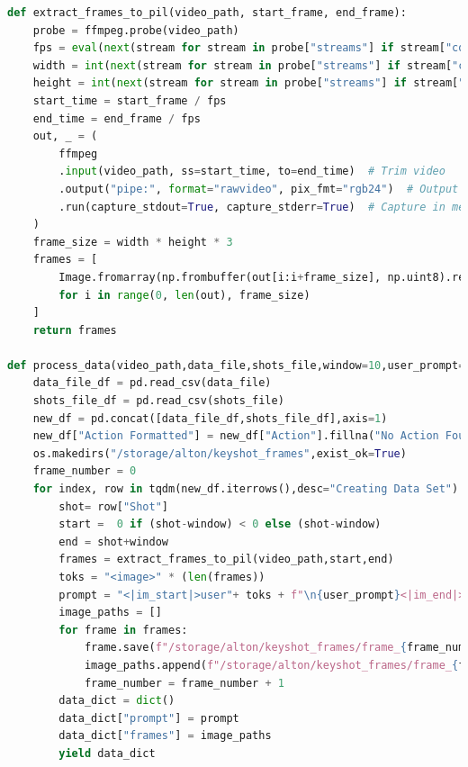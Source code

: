 \documentclass[12pt]{report}
\begin{document}
\begin{lstlisting}[language=Python, caption={Video DataSet Preparator Python Code}]
def extract_frames_to_pil(video_path, start_frame, end_frame):
    probe = ffmpeg.probe(video_path)
    fps = eval(next(stream for stream in probe["streams"] if stream["codec_type"] == "video")["r_frame_rate"])
    width = int(next(stream for stream in probe["streams"] if stream["codec_type"] == "video")["width"])
    height = int(next(stream for stream in probe["streams"] if stream["codec_type"] == "video")["height"])
    start_time = start_frame / fps
    end_time = end_frame / fps
    out, _ = (
        ffmpeg
        .input(video_path, ss=start_time, to=end_time)  # Trim video
        .output("pipe:", format="rawvideo", pix_fmt="rgb24")  # Output raw RGB frames
        .run(capture_stdout=True, capture_stderr=True)  # Capture in memory
    )
    frame_size = width * height * 3
    frames = [
        Image.fromarray(np.frombuffer(out[i:i+frame_size], np.uint8).reshape((height, width, 3)), 'RGB')
        for i in range(0, len(out), frame_size)
    ]
    return frames
    
def process_data(video_path,data_file,shots_file,window=10,user_prompt="What is this?"):
    data_file_df = pd.read_csv(data_file)
    shots_file_df = pd.read_csv(shots_file)
    new_df = pd.concat([data_file_df,shots_file_df],axis=1)
    new_df["Action Formatted"] = new_df["Action"].fillna("No Action Found")
    os.makedirs("/storage/alton/keyshot_frames",exist_ok=True)
    frame_number = 0
    for index, row in tqdm(new_df.iterrows(),desc="Creating Data Set"):
        shot= row["Shot"]
        start =  0 if (shot-window) < 0 else (shot-window)
        end = shot+window
        frames = extract_frames_to_pil(video_path,start,end)
        toks = "<image>" * (len(frames))
        prompt = "<|im_start|>user"+ toks + f"\n{user_prompt}<|im_end|><|im_start|>assistant "+row["Action Formatted"]+ "<|im_end|>"
        image_paths = []
        for frame in frames:
            frame.save(f"/storage/alton/keyshot_frames/frame_{frame_number}.jpg")
            image_paths.append(f"/storage/alton/keyshot_frames/frame_{frame_number}.jpg")
            frame_number = frame_number + 1
        data_dict = dict()
        data_dict["prompt"] = prompt
        data_dict["frames"] = image_paths
        yield data_dict


\end{lstlisting}
\end{document}
